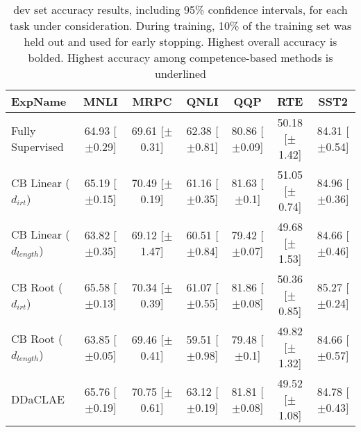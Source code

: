 \begin{table*}[ht]
\centering
\begingroup\small
\begin{tabular}{lcccccc}
  \toprule
ExpName & MNLI & MRPC & QNLI & QQP & RTE & SST2 \\ 
  \midrule
Fully Supervised & 64.93 [$\pm$0.29] & 69.61 [$\pm$0.31] & 62.38 [$\pm$0.81] & 80.86 [$\pm$0.09] & 50.18 [$\pm$1.42] & 84.31 [$\pm$0.54] \\ 
  CB Linear ($d_{irt}$) & 65.19 [$\pm$0.15] & 70.49 [$\pm$0.19] & 61.16 [$\pm$0.35] & 81.63 [$\pm$0.1] & 51.05 [$\pm$0.74] & 84.96 [$\pm$0.36] \\ 
  CB Linear ($d_{length}$) & 63.82 [$\pm$0.35] & 69.12 [$\pm$1.47] & 60.51 [$\pm$0.84] & 79.42 [$\pm$0.07] & 49.68 [$\pm$1.53] & 84.66 [$\pm$0.46] \\ 
  CB Root ($d_{irt}$) & 65.58 [$\pm$0.13] & 70.34 [$\pm$0.39] & 61.07 [$\pm$0.55] & 81.86 [$\pm$0.08] & 50.36 [$\pm$0.85] & 85.27 [$\pm$0.24] \\ 
  CB Root ($d_{length}$) & 63.85 [$\pm$0.05] & 69.46 [$\pm$0.41] & 59.51 [$\pm$0.98] & 79.48 [$\pm$0.1] & 49.82 [$\pm$1.32] & 84.66 [$\pm$0.57] \\ 
  DDaCLAE & 65.76 [$\pm$0.19] & 70.75 [$\pm$0.61] & 63.12 [$\pm$0.19] & 81.81 [$\pm$0.08] & 49.52 [$\pm$1.08] & 84.78 [$\pm$0.43] \\ 
   \bottomrule
\end{tabular}
\endgroup
\caption{dev set accuracy results, including 95\% confidence intervals, for each task under consideration. During training, 10\% of the training set was held out and used for early stopping. Highest overall accuracy is bolded. Highest accuracy among competence-based methods is underlined} 
\label{tab:acc_lstm-False}
\end{table*}
